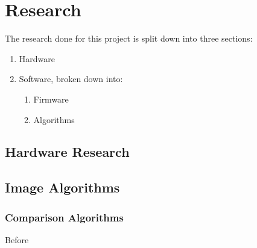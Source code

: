 \chapter{Research} \label{Chapter:Research}
The research done for this project is split down into three sections:
\begin{enumerate}
\item Hardware
\item Software, broken down into:
\begin{enumerate}
\item Firmware
\item Algorithms
\end{enumerate}
\end{enumerate}

\section{Hardware Research}

\section{Image Algorithms}

\subsection{Comparison Algorithms} 
Before 


